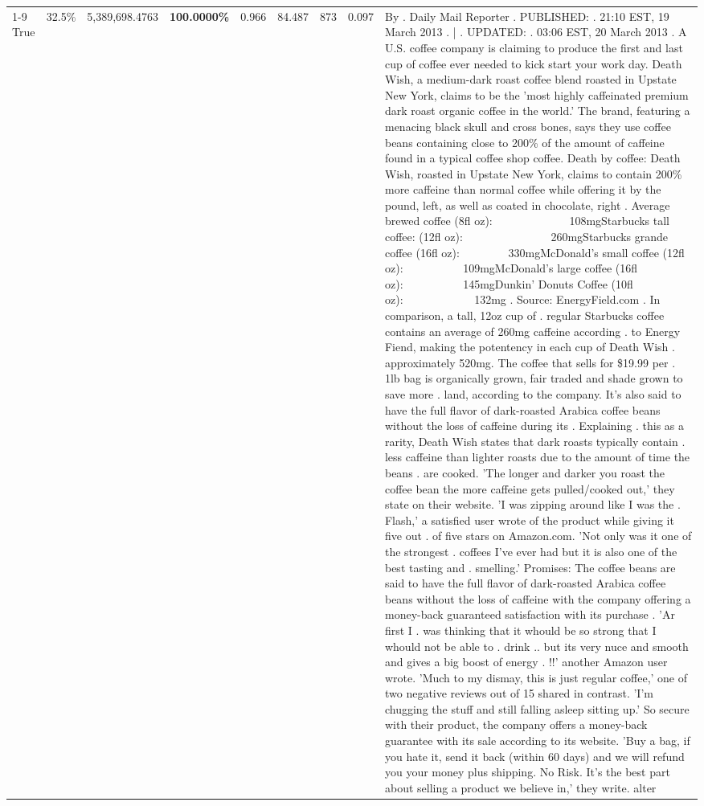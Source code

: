 \begin{table}[H]
{\begin{tabular}{lllrlllll}
\cline{1-9} \cline{2-9}
True & 32.5\% & 5,389,698.4763 & \bfseries \color{red} 100.0000\% & 0.966 & 84.487 & 873 & 0.097 & By . Daily Mail Reporter . PUBLISHED: . 21:10 EST, 19 March 2013 . | . UPDATED: . 03:06 EST, 20 March 2013 . A U.S. coffee company is claiming to produce the first and last cup of coffee ever needed to kick start your work day. Death Wish, a medium-dark roast coffee blend roasted in Upstate New York, claims to be the 'most highly caffeinated premium dark roast organic coffee in the world.' The brand, featuring a menacing black skull and cross bones, says they use coffee beans containing close to 200\% of the amount of caffeine found in a typical coffee shop coffee. Death by coffee: Death Wish, roasted in Upstate New York, claims to contain 200\% more caffeine than normal coffee while offering it by the pound, left, as well as coated in chocolate, right . Average brewed coffee (8fl oz):              108mgStarbucks tall coffee: (12fl oz):                260mgStarbucks grande coffee (16fl oz):         330mgMcDonald's small coffee (12fl oz):           109mgMcDonald's large coffee (16fl oz):           145mgDunkin' Donuts Coffee (10fl oz):             132mg . Source: EnergyField.com . In comparison, a tall, 12oz cup of . regular Starbucks coffee contains an average of 260mg caffeine according . to Energy Fiend, making the potentency in each cup of Death Wish . approximately 520mg. The coffee that sells for \$19.99 per . 1lb bag is organically grown, fair traded and shade grown to save more . land, according to the company. It's also said to have the full flavor of dark-roasted Arabica coffee beans without the loss of caffeine during its . Explaining . this as a rarity, Death Wish states that dark roasts typically contain . less caffeine than lighter roasts due to the amount of time the beans . are cooked. 'The longer and darker you roast the coffee bean the more caffeine gets pulled/cooked out,' they state on their website. 'I was zipping around like I was the . Flash,' a satisfied user wrote of the product while giving it five out . of five stars on Amazon.com. 'Not only was it one of the strongest . coffees I've ever had but it is also one of the best tasting and . smelling.’ Promises: The coffee beans are said to have the full flavor of dark-roasted Arabica coffee beans without the loss of caffeine with the company offering a money-back guaranteed satisfaction with its purchase . 'Ar first I . was thinking that it whould be so strong that I whould not be able to . drink .. but its very nuce and smooth and gives a big boost of energy . !!' another Amazon user wrote. 'Much to my dismay, this is just regular coffee,' one of two negative reviews out of 15 shared in contrast. 'I'm chugging the stuff and still falling asleep sitting up.' So secure with their product, the company offers a money-back guarantee with its sale according to its website. 'Buy a bag, if you hate it, send it back (within 60 days) and we will refund you your money plus shipping. No Risk. It’s the best part about selling a product we believe in,' they write. alter \\

\end{tabular}}
\end{table}
